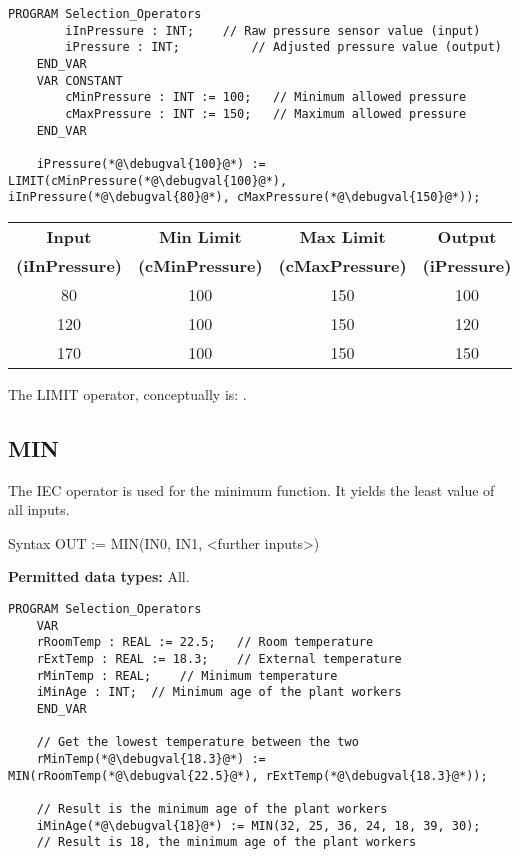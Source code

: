 \begin{lstlisting}[language=ST ]
	PROGRAM Selection_Operators
		iInPressure : INT;    // Raw pressure sensor value (input)
		iPressure : INT;          // Adjusted pressure value (output)
	END_VAR
	VAR CONSTANT 
		cMinPressure : INT := 100;   // Minimum allowed pressure
		cMaxPressure : INT := 150;   // Maximum allowed pressure
	END_VAR
	
	iPressure(*@\debugval{100}@*) := LIMIT(cMinPressure(*@\debugval{100}@*), iInPressure(*@\debugval{80}@*), cMaxPressure(*@\debugval{150}@*));
\end{lstlisting} 

\begin{tabular}{cccc}
\hline
\textbf{Input} & \textbf{Min Limit} & \textbf{Max Limit}& \textbf{Output} \\ 
\textbf{(iInPressure)}& \textbf{(cMinPressure)}& \textbf{(cMaxPressure)} & \textbf{(iPressure)} \\
\hline
80& 100& 150  & 100 \\
\hline
120  & 100  & 150  & 120 
 \\
\hline
170 & 100 & 150   & 150  \\
\hline
\end{tabular}



The LIMIT operator, conceptually is: 
.


\subsection{MIN}

The IEC operator is used for the minimum function. It yields the least value of all inputs. 

\begin{Box1}{Syntax}
	OUT := MIN(IN0, IN1, <further inputs>)
\end{Box1}	

\textbf{Permitted data types:} All.

\begin{lstlisting}[language=ST ]
	PROGRAM Selection_Operators
	VAR
	rRoomTemp : REAL := 22.5;   // Room temperature 
	rExtTemp : REAL := 18.3;    // External temperature
	rMinTemp : REAL;    // Minimum temperature
	iMinAge : INT;  // Minimum age of the plant workers
	END_VAR
	
	// Get the lowest temperature between the two
	rMinTemp(*@\debugval{18.3}@*) := MIN(rRoomTemp(*@\debugval{22.5}@*), rExtTemp(*@\debugval{18.3}@*));
	
	// Result is the minimum age of the plant workers
	iMinAge(*@\debugval{18}@*) := MIN(32, 25, 36, 24, 18, 39, 30);  
	// Result is 18, the minimum age of the plant workers
\end{lstlisting}


